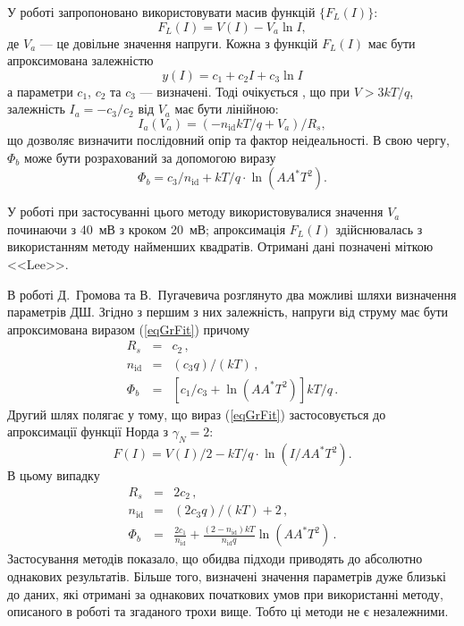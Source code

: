 У роботі \cite{Lee} запропоновано використовувати масив функцій $\{F_L(I)\}$:
\begin{equation}
\label{eqLee}
F_L(I)=V(I)-V_a\ln I,
\end{equation}
де
$V_a$ --- це довільне значення напруги.
Кожна з функцій $F_L(I)$ має бути апроксимована залежністю
\begin{equation}
\label{eqGrFit}
y(I)=c_1+c_2I+c_3\ln I
\end{equation}
а параметри $c_1$, $c_2$ та $c_3$ --- визначені.
Тоді очікується \cite{Lee}, що при $V>3kT/q$,
залежність $I_a=-c_3/c_2$ від $V_a$ має бути лінійною:
\begin{equation}
\label{eqLeeDet}
I_a(V_a)=(-n_\mathrm{id}kT/q+V_a)/R_s,
\end{equation}
що дозволяє визначити послідовний опір та фактор неідеальності.
В свою чергу, $\Phi_b$ може бути розрахований \cite{Lee} за допомогою виразу
\begin{equation}
\label{eqLeeFb}
\Phi_b=c_3/n_\mathrm{id}+kT/q\cdot\ln\left(AA^*T^2\right).
\end{equation}

У роботі при застосуванні цього методу використовувалися значення $V_a$ починаючи з 40~мВ з кроком 20~мВ;
апроксимація $F_L(I)$ здійснювалась з використанням методу найменших квадратів.
Отримані дані позначені міткою <<Lee>>.

В роботі Д.~Громова та В.~Пугачевича \cite{Gromov} розглянуто два можливі шляхи визначення параметрів ДШ.
Згідно з першим з них залежність, напруги від струму має бути апроксимована виразом (\ref{eqGrFit}) причому
\begin{eqnarray}
\label{eqGr1}
R_s&=&c_2\,,
\\
n_\mathrm{id}&=&(c_3q)/(kT)\,,
\\
\Phi_b&=&\left[c_1/c_3+\ln\left(AA^*T^2\right)\right]kT/q\,.
\end{eqnarray}
Другий шлях полягає у тому, що вираз (\ref{eqGrFit}) застосовується до апроксимації функції Норда з $\gamma_N=2$:
\begin{equation}
\label{eqGr2}
F(I)=V(I)/2-kT/q\cdot\ln(I/AA^*T^2).
\end{equation}
В цьому випадку \cite{Gromov}
\begin{eqnarray}
\label{eqGr2Det}
R_s&=&2c_2\,,
\\
n_\mathrm{id}&=&(2c_3q)/(kT)+2\,,
\\
\Phi_b&=&\frac{2c_1}{n_\mathrm{id}}+\frac{(2-n_\mathrm{id})kT}{n_\mathrm{id}q}\ln\left(AA^*T^2\right)\,.
\end{eqnarray}
Застосування методів показало, що обидва підходи приводять до абсолютно однакових результатів.
Більше того, визначені значення параметрів дуже близькі до даних, які отримані за однакових початкових умов при використанні методу, описаного в роботі \cite{Lee} та згаданого трохи вище.
Тобто ці методи не є незалежними.

